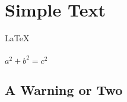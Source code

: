 \documentclass{article}
\begin{document}
 
 
\section{Simple Text}          %
\LaTeX \,\\ \\
 $a^2+b^2=c^2$


\subsection{A Warning or Two}  
\end{document}
